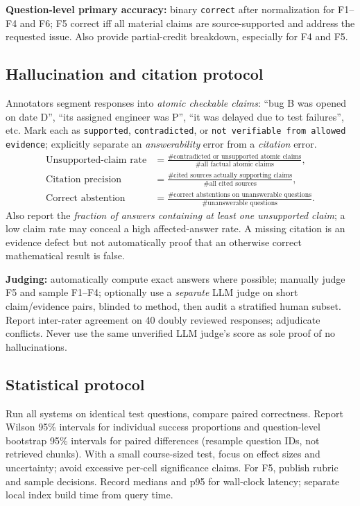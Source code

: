 \documentclass[11pt,a4paper]{article}
\begin{document}
\textbf{Question-level primary accuracy:} binary \texttt{correct} after normalization for F1--F4 and F6; F5 correct iff all material claims are source-supported and address the requested issue. Also provide partial-credit breakdown, especially for F4 and F5.

\subsection{Hallucination and citation protocol}
Annotators segment responses into \emph{atomic checkable claims}: ``bug B was opened on date D'', ``its assigned engineer was P'', ``it was delayed due to test failures'', etc. Mark each as \texttt{supported}, \texttt{contradicted}, or \texttt{not verifiable from allowed evidence}; explicitly separate an \emph{answerability} error from a \emph{citation} error.
\begin{align*}
\text{Unsupported-claim rate} &= \frac{\#\text{contradicted or unsupported atomic claims}}{\#\text{all factual atomic claims}},\\
\text{Citation precision} &= \frac{\#\text{cited sources actually supporting claims}}{\#\text{all cited sources}},\\
\text{Correct abstention} &= \frac{\#\text{correct abstentions on unanswerable questions}}{\#\text{unanswerable questions}}.
\end{align*}
Also report the \emph{fraction of answers containing at least one unsupported claim}; a low claim rate may conceal a high affected-answer rate. A missing citation is an evidence defect but not automatically proof that an otherwise correct mathematical result is false.

\textbf{Judging:} automatically compute exact answers where possible; manually judge F5 and sample F1--F4; optionally use a \emph{separate} LLM judge on short claim/evidence pairs, blinded to method, then audit a stratified human subset. Report inter-rater agreement on 40 doubly reviewed responses; adjudicate conflicts. Never use the same unverified LLM judge's score as sole proof of no hallucinations.

\subsection{Statistical protocol}
Run all systems on identical test questions, compare paired correctness. Report Wilson 95\% intervals for individual success proportions and question-level bootstrap 95\% intervals for paired differences (resample question IDs, not retrieved chunks). With a small course-sized test, focus on effect sizes and uncertainty; avoid excessive per-cell significance claims. For F5, publish rubric and sample decisions. Record medians and p95 for wall-clock latency; separate local index build time from query time.
\end{document}
